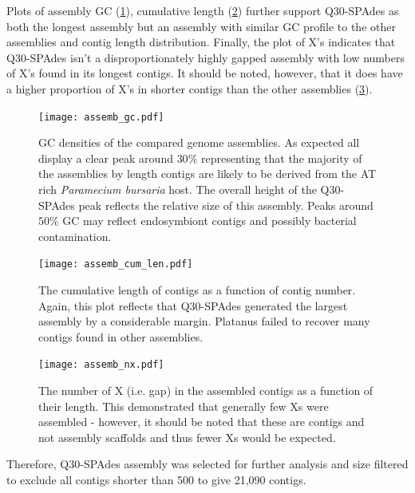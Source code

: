 Plots of assembly GC (\cref{fig:assemb_gc}), cumulative length (\cref{fig:assemb_len})
further support Q30-SPAdes as both the longest assembly
but an assembly with similar GC profile to the other assemblies and contig length distribution.
Finally, the plot of X's indicates that Q30-SPAdes isn't a disproportionately highly gapped
assembly with low numbers of X's found in its longest contigs.  It should be noted, however,
that it does have a higher proportion of X's in shorter contigs than the other
assemblies (\cref{fig:assemb_nx}).

\begin{figure}
    \centering
    \texttt{[image: assemb\_gc.pdf]}
    \caption[Comparative genome assembly GC densities]{GC densities of the compared genome assemblies.  As expected
        all display a clear peak around \(30\%\) representing that the majority
    of the assemblies by length contigs are likely to be derived from the AT rich
    \textit{Paramecium bursaria} host.
The overall height of the Q30-SPAdes peak reflects the relative size of this assembly.
Peaks around \(50\%\) GC may reflect endosymbiont contigs and possibly
bacterial contamination.}
    \label{fig:assemb_gc}
\end{figure}

\begin{figure}
    \centering
    \texttt{[image: assemb\_cum\_len.pdf]}
    \caption[Comparative cumulative contig lengths of genome assemblies]{The cumulative length of contigs as a function of
        contig number.  Again, this plot reflects
        that Q30-SPAdes generated the largest assembly
        by a considerable margin. Platanus failed to recover
    many contigs found in other assemblies.}
    \label{fig:assemb_len}
\end{figure}

\begin{figure}
    \centering
    \texttt{[image: assemb\_nx.pdf]}
    \caption[Comparative genome assembly gaps]{The number of X (i.e. gap) in the assembled contigs as a function of their
        length.  This demonstrated that generally few Xs were assembled - however, it should 
        be noted that these are contigs and not assembly scaffolds and thus fewer Xs
    would be expected.}
    \label{fig:assemb_nx}
\end{figure}

Therefore, Q30-SPAdes assembly was selected for further analysis
and size filtered to exclude all contigs shorter than \SI{500}{\bp} 
to give 21,090 contigs. 

